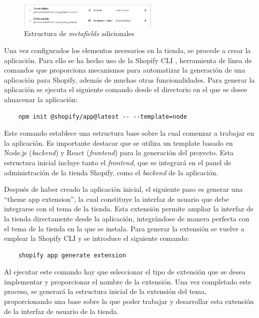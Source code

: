 \documentclass[11pt]{article}
\begin{document}
\begin{figure}[H]
    \centering
    \includegraphics[width=0.6\textwidth]{imagenesUS2/metafieldsAdicionales.png}
    \caption{\label{fig:metafieldsAdicionales}Estructura de \textit{metafields} adicionales}
    \vspace{\fill}
\end{figure}

Una vez configurados los elementos necesarios en la tienda, se procede a crear la aplicación. Para ello se ha hecho uso de la Shopify CLI \cite{shopify-cli}, herramienta
de línea de comandos que proporciona mecanismos para automatizar la generación de una aplicación para Shopify, además de muchas otras funcionalidades.
Para generar la aplicación se ejecuta el siguiente comando desde el directorio en el que se desee almacenar la aplicación: 
\begin{lstlisting}
    npm init @shopify/app@latest -- --template=node
\end{lstlisting}

Este comando establece una estructura base sobre la cual comenzar a trabajar en la aplicación. Es importante destacar que se utiliza un template 
basado en Node.js (\textit{backend}) y React (\textit{frontend}) para la generación del proyecto. Esta estructura inicial incluye tanto el \textit{frontend}, que se 
integrará en el panel de administración de la tienda Shopify, como el \textit{backend} de la aplicación.

Después de haber creado la aplicación inicial, el siguiente paso es generar una ``theme app extension'',
la cual constituye la interfaz de usuario que debe integrarse con el tema de la tienda. Esta extensión 
permite ampliar la interfaz de la tienda directamente desde la aplicación, integrándose de manera perfecta 
con el tema de la tienda en la que se instala. Para generar la extensión se vuelve a emplear la Shopify CLI y se introduce el siguiente comando:

\begin{lstlisting}
    shopify app generate extension
\end{lstlisting}

Al ejecutar este comando hay que seleccionar el tipo de extensión que se desea implementar y proporcionar el nombre de la extensión. Una vez completado este proceso,
se generará la estructura inicial de la extensión del tema, proporcionando una base sobre la que poder trabajar y desarrollar esta extensión 
de la interfaz de usuario de la tienda.
\end{document}

